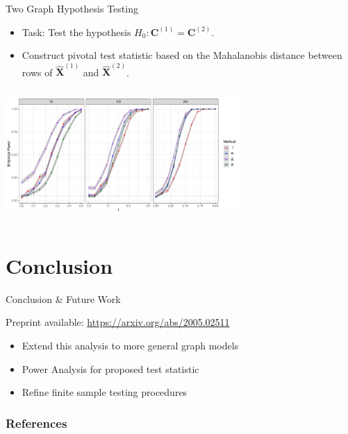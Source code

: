 \documentclass[handout]{beamer}
\newcommand{\bvar}[1]{\mathbf{#1}}
\begin{document}
\begin{frame}{Two Graph Hypothesis Testing}
    \begin{itemize}
        \item Task: Test the hypothesis $H_0: \bvar{C}^{(1)} = \bvar{C}^{(2)}$. 
        \item Construct pivotal test statistic based on the Mahalanobis distance between rows of $\hat{\bvar{X}}^{(1)}$ and $\hat{\bvar{X}}^{(2)}$. \pause
    \end{itemize}

    \begin{center}
        \includegraphics[width = 3.5in, height = 2in]{empirical_power_oracle_correction_variable_t.pdf}
    \end{center}
\end{frame}


\section{Conclusion}

\begin{frame}{Conclusion \& Future Work}
    \begin{center}
    Preprint available: \url{https://arxiv.org/abs/2005.02511}\pause
    \end{center}
    \begin{itemize}
        \item Extend this analysis to more general graph models
        \item Power Analysis for proposed test statistic 
        \item Refine finite sample testing procedures 
    \end{itemize}
\end{frame}


\begin{frame}[t,allowframebreaks]
  \frametitle{References}
  \printbibliography
 \end{frame}
\end{document}

